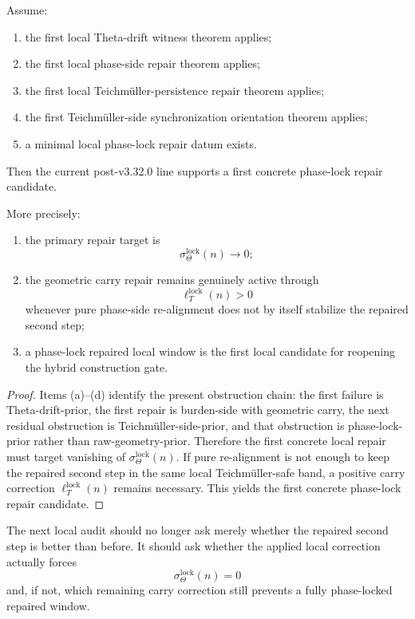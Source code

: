 \begin{theorem}
\label{thm:first-phase-lock-repair-theorem}
Assume:
\begin{enumerate}[leftmargin=2em,label=(\alph*)]
  \item the first local Theta-drift witness theorem applies;
  \item the first local phase-side repair theorem applies;
  \item the first local Teichm\"uller-persistence repair theorem applies;
  \item the first Teichm\"uller-side synchronization orientation theorem applies;
  \item a minimal local phase-lock repair datum exists.
\end{enumerate}
Then the current post-v3.32.0 line supports a first concrete phase-lock repair candidate.

More precisely:
\begin{enumerate}[leftmargin=2em,label=(\roman*)]
  \item the primary repair target is
  \[
    \sigma_{\Theta}^{\mathrm{lock}}(n) \to 0;
  \]
  \item the geometric carry repair remains genuinely active through
  \[
    \ell_T^{\mathrm{lock}}(n)>0
  \]
  whenever pure phase-side re-alignment does not by itself stabilize the repaired second step;
  \item a phase-lock repaired local window is the first local candidate for reopening the hybrid construction gate.
\end{enumerate}
\end{theorem}

\begin{proof}
Items (a)--(d) identify the present obstruction chain: the first failure is Theta-drift-prior, the first repair is burden-side with geometric carry, the next residual obstruction is Teichm\"uller-side-prior, and that obstruction is phase-lock-prior rather than raw-geometry-prior. Therefore the first concrete local repair must target vanishing of $\sigma_{\Theta}^{\mathrm{lock}}(n)$. If pure re-alignment is not enough to keep the repaired second step in the same local Teichm\"uller-safe band, a positive carry correction $\ell_T^{\mathrm{lock}}(n)$ remains necessary. This yields the first concrete phase-lock repair candidate.
\end{proof}

\begin{corollary}
\label{cor:current-phase-lock-repair-working-rule}
The next local audit should no longer ask merely whether the repaired second step is better than before. It should ask whether the applied local correction actually forces
\[
  \sigma_{\Theta}^{\mathrm{lock}}(n)=0
\]
and, if not, which remaining carry correction still prevents a fully phase-locked repaired window.
\end{corollary}

